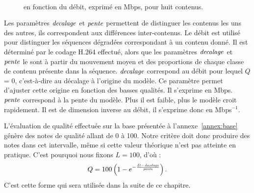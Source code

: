 \begin{figure}[htbp]
\centering
{}\hfill
{}\\
\caption{\Dcent{} en fonction du débit, exprimé en Mbps, pour huit contenus.}
\label{fig:DMOSrateCodeurRefHD}
\end{figure}

Les paramètres $\mathit{decalage}$ et $\mathit{pente}$ permettent de distinguer les contenus les uns des autres, ils correspondent aux différences inter-contenus. Le débit est utilisé pour distinguer les séquences dégradées correspondant à un contenu donné. Il est déterminé par le codage H.264 effectué, alors que les paramètres $\mathit{decalage}$ et $\mathit{pente}$ le sont à partir du mouvement moyen et des proportions de chaque classe de contenu présente dans la séquence. $\mathit{decalage}$ correspond au débit pour lequel $Q$ = 0, c'est-à-dire au décalage à l'origine du modèle. Ce paramètre permet d'ajuster cette origine en fonction des basses qualités. Il s'exprime en Mbps. $\mathit{pente}$ correspond à la pente du modèle. Plus il est faible, plus le modèle croit rapidement. Il est de dimension inverse au débit, il s'exprime donc en Mbps$^{-1}$.

L'évaluation de qualité effectuée sur la base présentée à l'annexe~\ref{annex:base} génère des notes de qualité allant de 0 à 100. Notre critère doit donc produire des notes dans cet intervalle, même si cette valeur théorique n'est pas atteinte en pratique. C'est pourquoi nous fixons $L=100$, d'où :
\begin{equation}
Q = 100 \left(1 - e^{-\frac{D - \mathit{decalage}}{\mathit{pente}}}\right) \label{eq:modele}.
\end{equation}
%
C'est cette forme qui sera utilisée dans la suite de ce chapitre.

